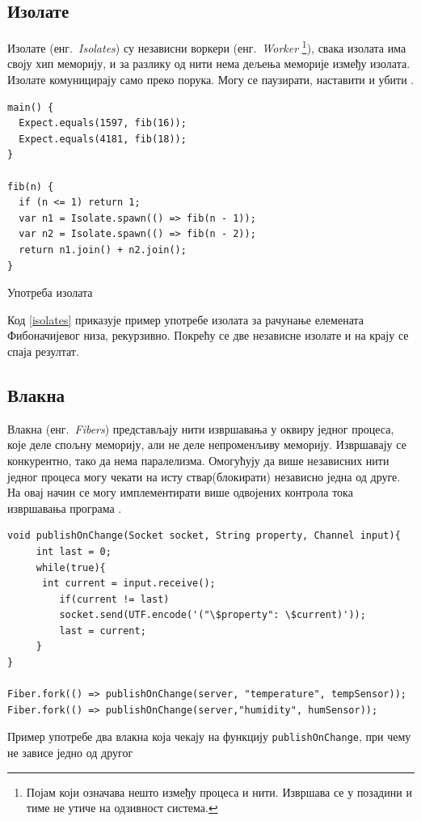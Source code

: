 \documentclass[12pt,oneside]{memoir}
\begin{document}
\subsection{Изолате}

Изолате (енг.~\textit{Isolates}) су независни воркери (енг.~\textit{Worker} \footnote{Појам који означава нешто између процеса и нити. Извршава се у позадини и тиме не утиче на одзивност система. }), свака изолата има своју хип меморију, и за разлику од нити нема дељења меморије између изолата. Изолате комуницирају само преко порука. Могу се паузирати, наставити и убити \cite{procesi_i_izolate}.

\begin{listing}
\begin{verbatim}
main() {
  Expect.equals(1597, fib(16));
  Expect.equals(4181, fib(18)); 
}

fib(n) {
  if (n <= 1) return 1;
  var n1 = Isolate.spawn(() => fib(n - 1));
  var n2 = Isolate.spawn(() => fib(n - 2));
  return n1.join() + n2.join();
}
\end{verbatim}
\caption{Употреба изолата}
\label{isolates}
\end{listing}

Код \ref{isolates} приказује пример употребе изолата за рачунање елемената Фибоначијевог низа, рекурзивно. Покрећу се две независне изолате и на крају се спаја резултат.

\subsection{Влакна}

Влакна (енг.~\textit{Fibers}) представљају нити извршавања у оквиру једног процеса, које деле спољну меморију, али не деле непроменљиву меморију. Извршавају се конкурентно, тако да нема паралелизма. Омогућују да више независних нити једног процеса могу чекати на исту ствар(блокирати) независно једна од друге. На овај начин се могу имплементирати више одвојених контрола тока извршавања програма \cite{korutine_i_vlakna}.

\begin{listing}
\begin{verbatim}
void publishOnChange(Socket socket, String property, Channel input){
  	 int last = 0;
  	 while(true){
   	  int current = input.receive();
    	 if(current != last)
      	 socket.send(UTF.encode('("\$property": \$current)'));
    	 last = current;
  	 }
}

Fiber.fork(() => publishOnChange(server, "temperature", tempSensor));
Fiber.fork(() => publishOnChange(server,"humidity", humSensor));
\end{verbatim}
\caption{Пример употребе два влакна која чекају на функцију \texttt{publishOnChange}, при чему не зависе једно од другог}
\label{fibers}
\end{listing}
\end{document}
